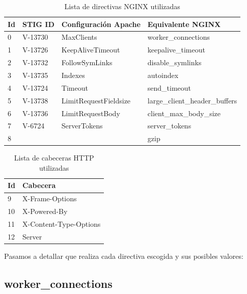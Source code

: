 \begin{table}[H]
\begin{tabular}{|l|l|l|l|}
\hline
Id & STIG ID & Configuración Apache  & Equivalente NGINX              \\ \hline
0  & V-13730 & MaxClients            & worker\_connections            \\ \hline
1  & V-13726 & KeepAliveTimeout      & keepalive\_timeout             \\ \hline
2  & V-13732 & FollowSymLinks        & disable\_symlinks              \\ \hline
3  & V-13735 & Indexes               & autoindex                      \\ \hline
4  & V-13724 & Timeout               & send\_timeout                  \\ \hline
5  & V-13738 & LimitRequestFieldsize & large\_client\_header\_buffers \\ \hline
6  & V-13736 & LimitRequestBody      & client\_max\_body\_size        \\ \hline
7  & V-6724  & ServerTokens          & server\_tokens                 \\ \hline
8  &         &                       & gzip                           \\ \hline
\end{tabular}
\label{table:apache_nginx_directives}
\caption{Lista de directivas NGINX utilizadas}
\end{table}

\begin{table}[H]
\begin{tabular}{|l|l|}
\hline
Id & Cabecera                       \\ \hline
9  & X-Frame-Options                \\ \hline
10  & X-Powered-By                   \\ \hline
11 & X-Content-Type-Options         \\ \hline
12 & Server                         \\ \hline
\end{tabular}
\label{table:ngingx_headers}
\caption{Lista de cabeceras HTTP utilizadas}
\end{table}


\bigskip
Pasamos a detallar que realiza cada directiva escogida y sus posibles valores:

\subsection{worker\_connections}

